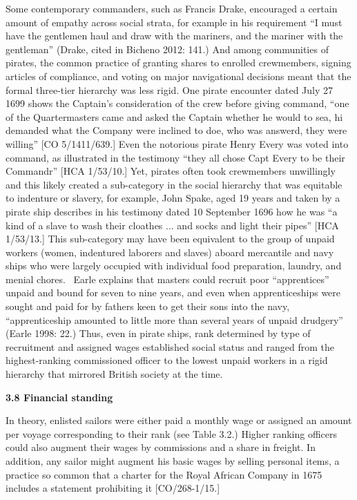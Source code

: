 \begin{styleStandard}
Some contemporary commanders, such as Francis Drake, encouraged a certain amount of empathy across social strata, for example in his requirement “I must have the gentlemen haul and draw with the mariners, and the mariner with the gentleman” (Drake, cited in Bicheno 2012: 141.) And among communities of pirates, the common practice of granting shares to enrolled crewmembers, signing articles of compliance, and voting on major navigational decisions meant that the formal three-tier hierarchy was less rigid. One pirate encounter dated July 27 1699 shows the Captain’s consideration of the crew before giving command, “one of the Quartermasters came and asked the Captain whether he would to sea, hi demanded what the Company were inclined to doe, who was answerd, they were willing” [CO 5/1411/639.] Even the notorious pirate Henry Every was voted into command, as illustrated in the testimony “they all chose Capt Every to be their Commandr” [HCA 1/53/10.] Yet, pirates often took crewmembers unwillingly and this likely created a sub-category in the social hierarchy that was equitable to indenture or slavery, for example, John Spake, aged 19 years and taken by a pirate ship describes in his testimony dated 10 September 1696 how he was “a kind of a slave to wash their cloathes ... and socks and light their pipes” [HCA 1/53/13.] This sub-category may have been equivalent to the group of unpaid workers (women, indentured laborers and slaves) aboard mercantile and navy ships who were largely occupied with individual food preparation, laundry, and menial chores. \ Earle explains that masters could recruit poor “apprentices” unpaid and bound for seven to nine years, and even when apprenticeships were sought and paid for by fathers keen to get their sons into the navy, “apprenticeship amounted to little more than several years of unpaid drudgery” (Earle 1998: 22.) Thus, even in pirate ships, rank determined by type of recruitment and assigned wages established social status and ranged from the highest-ranking commissioned officer to the lowest unpaid workers in a rigid hierarchy that mirrored British society at the time. 
\end{styleStandard}

\begin{styleStandard}
\textbf{3.8 Financial standing}
\end{styleStandard}

\begin{styleStandard}
In theory, enlisted sailors were either paid a monthly wage or assigned an amount per voyage corresponding to their rank (see Table 3.2.) Higher ranking officers could also augment their wages by commissions and a share in freight. In addition, any sailor might augment his basic wages by selling personal items, a practice so common that a charter for the Royal African Company in 1675 includes a statement prohibiting it [CO/268-1/15.] \ 
\end{styleStandard}

